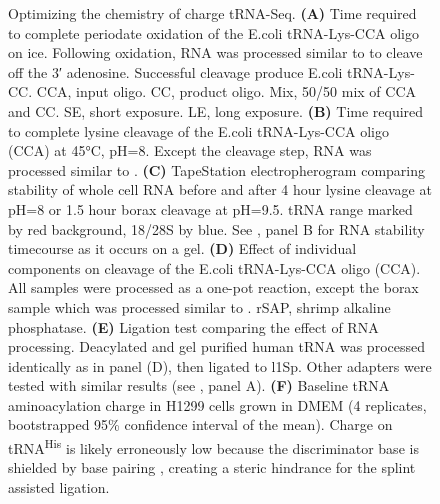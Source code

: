 \documentclass[9pt,lineno]{elife}
\begin{document}
\begin{figure}[ht!]
\centering
{}
\caption{
Optimizing the chemistry of charge tRNA-Seq.
\textbf{(A)} Time required to complete periodate oxidation of the E.coli tRNA-Lys-CCA oligo on ice.
Following oxidation, RNA was processed similar to \cite{Evans2017-st} to cleave off the 3′ adenosine.
Successful cleavage produce E.coli tRNA-Lys-CC.
CCA, input oligo.
CC, product oligo.
Mix, 50/50 mix of CCA and CC.
SE, short exposure.
LE, long exposure.
\textbf{(B)} Time required to complete lysine cleavage of the E.coli tRNA-Lys-CCA oligo (CCA) at 45°C, pH=8.
Except the cleavage step, RNA was processed similar to \cite{Evans2017-st}.
\textbf{(C)} TapeStation electropherogram comparing stability of whole cell RNA before and after 4 hour lysine cleavage at pH=8 or 1.5 hour borax cleavage at pH=9.5.
tRNA range marked by red background, 18/28S by blue.
See , panel B for RNA stability timecourse as it occurs on a gel.
\textbf{(D)} Effect of individual components on cleavage of the E.coli tRNA-Lys-CCA oligo (CCA).
All samples were processed as a one-pot reaction, except the borax sample which was processed similar to \cite{Evans2017-st}.
rSAP, shrimp alkaline phosphatase.
\textbf{(E)} Ligation test comparing the effect of RNA processing.
Deacylated and gel purified human tRNA was processed identically as in panel (D), then ligated to l1Sp.
Other adapters were tested with similar results (see , panel A).
\textbf{(F)} Baseline tRNA aminoacylation charge in H1299 cells grown in DMEM (4 replicates, bootstrapped 95\% confidence interval of the mean).
Charge on tRNA\textsuperscript{His} is likely erroneously low because the discriminator base is shielded by base pairing \citep{Heinemann2012-hq}, creating a steric hindrance for the splint assisted ligation.
}
\label{fig:Fig2}


\end{figure}
\end{document}
